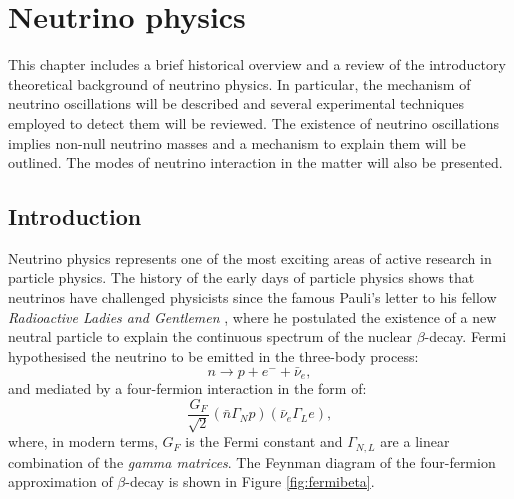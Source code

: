 \chapter{\label{ch:2-neutrinophysics}Neutrino physics}

\minitoc

This chapter includes a brief historical overview and a review of the introductory theoretical background of neutrino physics. In particular, the mechanism of neutrino oscillations will be described and several experimental techniques employed to detect them will be reviewed. The existence of neutrino oscillations implies non-null neutrino masses and a mechanism to explain them will be outlined. The modes of neutrino interaction in the matter will also be presented.%

\section{Introduction}

Neutrino physics represents one of the most exciting areas of active research in particle physics. The history of the early days of particle physics shows that neutrinos have challenged physicists since the famous Pauli's letter to his fellow \emph{Radioactive Ladies and Gentlemen} \cite{Pauli:1930pc}, where he postulated the existence of a new neutral particle to explain the continuous spectrum of the nuclear $\beta$-decay.  Fermi hypothesised the neutrino to be emitted in the three-body process:
\begin{equation}
    n\rightarrow p + e^{-} + \bar{\nu}_{e},
\end{equation}
and mediated by a four-fermion interaction in the form of:
\begin{equation}
    \frac{G_{F}}{\sqrt{2}}(\bar{n}\Gamma_{N}p)(\bar{\nu}_{e}\Gamma_{L}e),
\end{equation}
where, in modern terms, $G_{F}$ is the Fermi constant and $\Gamma_{N,L}$ are a linear combination of the \emph{gamma matrices}. The Feynman diagram of the four-fermion approximation of $\beta$-decay is shown in Figure \ref{fig:fermibeta}.

